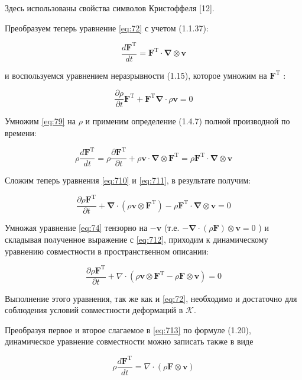 Здесь использованы свойства символов Кристоффеля [12].

Преобразуем теперь уравнение \eqref{eq:72} с учетом (1.1.37):

\begin{equation}
\label{eq:710}
\frac{d \mathbf{F}^{\mathrm{T}}}{d t}=\mathbf{F}^{\mathrm{T}} \cdot \boldsymbol{\nabla} \otimes \mathbf{v} 
\end{equation}

и воспользуемся уравнением неразрывности (1.15), которое умножим на $\mathbf{F}^{\mathrm{T}}$ :

\begin{equation}
\label{eq:711}
\frac{\partial \rho}{\partial t} \mathbf{F}^{\mathrm{T}}+\mathbf{F}^{\mathrm{T}} \boldsymbol{\nabla} \cdot \rho \mathbf{v}=0 
\end{equation}

Умножим \eqref{eq:79} на $\rho$ и применим определение (1.4.7) полной производной по времени:

\begin{equation}
\label{eq:712}
\rho \frac{d \mathbf{F}^{\mathrm{T}}}{d t}=\rho \frac{\partial \mathbf{F}^{\mathrm{T}}}{\partial t}+\rho \mathbf{v} \cdot \boldsymbol{\nabla} \otimes \mathbf{F}^{\mathrm{T}}=\rho \mathbf{F}^{\mathrm{T}} \cdot \boldsymbol{\nabla} \otimes \mathbf{v} 
\end{equation}


Сложим теперь уравнения \eqref{eq:710} и \eqref{eq:711}, в результате получим:


\begin{equation}
\label{eq:713}
\frac{\partial \rho \mathbf{F}^{\mathrm{T}}}{\partial t}+\boldsymbol{\nabla} \cdot\left(\rho \mathbf{v} \otimes \mathbf{F}^{\mathrm{T}}\right)-\rho \mathbf{F}^{\mathrm{T}} \cdot \boldsymbol{\nabla} \otimes \mathbf{v}=0 
\end{equation}


Умножая уравнение \eqref{eq:74} тензорно на $-\mathbf{v}$ (т.е. $-\boldsymbol{\nabla} \cdot(\rho \mathbf{F}) \otimes \mathbf{v}=0$ ) и складывая полученное выражение с \eqref{eq:712}, приходим к динамическому уравнению совместности в пространственном описании:


\begin{equation}
\label{eq:714}
\frac{\partial \rho \mathbf{F}^{\mathrm{T}}}{\partial t}+\nabla \cdot\left(\rho \mathbf{v} \otimes \mathbf{F}^{\mathrm{T}}-\rho \mathbf{F} \otimes \mathbf{v}\right)=0 
\end{equation}


Выполнение этого уравнения, так же как и \eqref{eq:72}, необходимо и достаточно для соблюдения условий совместности деформаций в $\mathcal{K}$.

Преобразуя первое и второе слагаемое в \eqref{eq:713} по формуле (1.20), динамическое уравнение совместности можно записать также в виде


\begin{equation}
\label{eq:715}
\rho \frac{d \mathbf{F}^{\mathrm{T}}}{d t}=\nabla \cdot(\rho \mathbf{F} \otimes \mathbf{v})
\end{equation}
